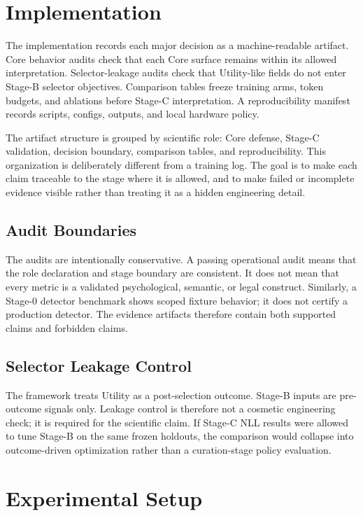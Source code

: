 \documentclass[conference]{IEEEtran}
\begin{document}
\section{Implementation}
The implementation records each major decision as a machine-readable artifact.
Core behavior audits check that each Core surface remains within its allowed
interpretation.  Selector-leakage audits check that Utility-like fields do not
enter Stage-B selector objectives.  Comparison tables freeze training arms,
token budgets, and ablations before Stage-C interpretation.  A reproducibility
manifest records scripts, configs, outputs, and local hardware policy.

The artifact structure is grouped by scientific role: Core defense, Stage-C
validation, decision boundary, comparison tables, and reproducibility.  This
organization is deliberately different from a training log.  The goal is to
make each claim traceable to the stage where it is allowed, and to make failed
or incomplete evidence visible rather than treating it as a hidden engineering
detail.

\subsection{Audit Boundaries}
The audits are intentionally conservative.  A passing operational audit means
that the role declaration and stage boundary are consistent.  It does not mean
that every metric is a validated psychological, semantic, or legal construct.
Similarly, a Stage-0 detector benchmark shows scoped fixture behavior; it does
not certify a production detector.  The evidence artifacts therefore contain
both supported claims and forbidden claims.

\subsection{Selector Leakage Control}
The framework treats Utility as a post-selection outcome.  Stage-B inputs are
pre-outcome signals only.  Leakage control is therefore not a cosmetic
engineering check; it is required for the scientific claim.  If Stage-C NLL
results were allowed to tune Stage-B on the same frozen holdouts, the
comparison would collapse into outcome-driven optimization rather than a
curation-stage policy evaluation.

\section{Experimental Setup}
\end{document}
